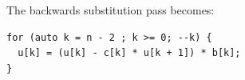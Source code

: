 \documentclass[conference]{IEEEtran}
\begin{document}
The backwards substitution pass becomes:

\begin{lstlisting}
for (auto k = n - 2 ; k >= 0; --k) {
  u[k] = (u[k] - c[k] * u[k + 1]) * b[k];
} 
\end{lstlisting}



%
%
%
%
%
%
%
%
\end{document}
